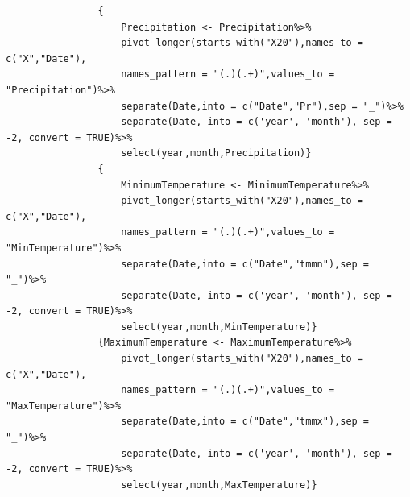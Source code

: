 \documentclass[12pt,a4paper]{book}
\begin{document}
		\begin{shaded}
			\begin{verbatim}
				{
					Precipitation <- Precipitation%>%
					pivot_longer(starts_with("X20"),names_to =  c("X","Date"),
					names_pattern = "(.)(.+)",values_to = "Precipitation")%>%
					separate(Date,into = c("Date","Pr"),sep = "_")%>% 
					separate(Date, into = c('year', 'month'), sep = -2, convert = TRUE)%>%
					select(year,month,Precipitation)}
				{
					MinimumTemperature <- MinimumTemperature%>%
					pivot_longer(starts_with("X20"),names_to =  c("X","Date"),
					names_pattern = "(.)(.+)",values_to = "MinTemperature")%>%
					separate(Date,into = c("Date","tmmn"),sep = "_")%>% 
					separate(Date, into = c('year', 'month'), sep = -2, convert = TRUE)%>%
					select(year,month,MinTemperature)}
				{MaximumTemperature <- MaximumTemperature%>%
					pivot_longer(starts_with("X20"),names_to =  c("X","Date"),
					names_pattern = "(.)(.+)",values_to = "MaxTemperature")%>%
					separate(Date,into = c("Date","tmmx"),sep = "_")%>% 
					separate(Date, into = c('year', 'month'), sep = -2, convert = TRUE)%>%
					select(year,month,MaxTemperature)}
			\end{verbatim}
		\end{shaded}
\end{document}
